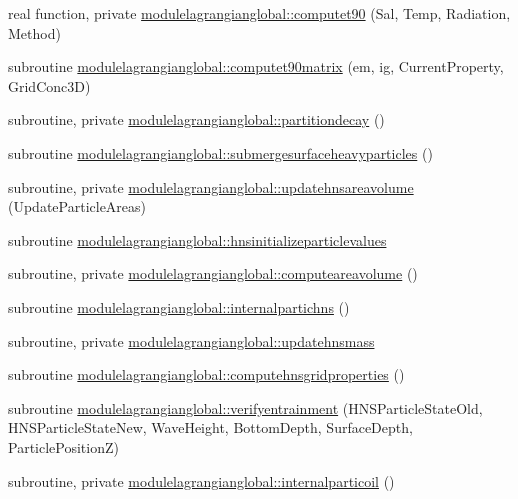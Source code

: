 \begin{DoxyCompactItemize}
\item 
real function, private \mbox{\hyperlink{namespacemodulelagrangianglobal_a963d16d76b64077295c077df5dcf9e8d}{modulelagrangianglobal\+::computet90}} (Sal, Temp, Radiation, Method)
\item 
subroutine \mbox{\hyperlink{namespacemodulelagrangianglobal_aa1fa562342fd711319936084593cafbf}{modulelagrangianglobal\+::computet90matrix}} (em, ig, Current\+Property, Grid\+Conc3D)
\item 
subroutine, private \mbox{\hyperlink{namespacemodulelagrangianglobal_acb7dabdfc279e06f8231d68f34a4bd76}{modulelagrangianglobal\+::partitiondecay}} ()
\item 
subroutine \mbox{\hyperlink{namespacemodulelagrangianglobal_ac3b09a7520aad0e3fd4d4778451773cc}{modulelagrangianglobal\+::submergesurfaceheavyparticles}} ()
\item 
subroutine, private \mbox{\hyperlink{namespacemodulelagrangianglobal_a4efc172cbdf3206e44a5ff0f788c26e1}{modulelagrangianglobal\+::updatehnsareavolume}} (Update\+Particle\+Areas)
\item 
subroutine \mbox{\hyperlink{namespacemodulelagrangianglobal_a480cf2e664cf8fc186fb4ad80025693c}{modulelagrangianglobal\+::hnsinitializeparticlevalues}}
\item 
subroutine, private \mbox{\hyperlink{namespacemodulelagrangianglobal_ad6190c60927cd9e871e45fcfd4fc5dd2}{modulelagrangianglobal\+::computeareavolume}} ()
\item 
subroutine \mbox{\hyperlink{namespacemodulelagrangianglobal_a0d3f22e59bfbc417e9432a9f18a9027d}{modulelagrangianglobal\+::internalpartichns}} ()
\item 
subroutine, private \mbox{\hyperlink{namespacemodulelagrangianglobal_a48c7d753da87150903bd31cb8ff38fb6}{modulelagrangianglobal\+::updatehnsmass}}
\item 
subroutine \mbox{\hyperlink{namespacemodulelagrangianglobal_a9448f83b93f06396188a1d8aac9725f8}{modulelagrangianglobal\+::computehnsgridproperties}} ()
\item 
subroutine \mbox{\hyperlink{namespacemodulelagrangianglobal_ad6565cf35585f706dfd2fa59deaed3b4}{modulelagrangianglobal\+::verifyentrainment}} (H\+N\+S\+Particle\+State\+Old, H\+N\+S\+Particle\+State\+New, Wave\+Height, Bottom\+Depth, Surface\+Depth, Particle\+PositionZ)
\item 
subroutine, private \mbox{\hyperlink{namespacemodulelagrangianglobal_aaea914ea480f8d07a53b58420bf6b67e}{modulelagrangianglobal\+::internalparticoil}} ()
\item 

\end{DoxyCompactItemize}

